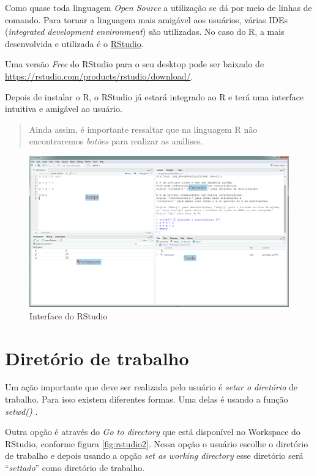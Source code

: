 \documentclass[
]{book}
\theoremstyle{definition}
\theoremstyle{definition}
\theoremstyle{definition}
\theoremstyle{remark}
\begin{document}
Como quase toda linguagem \emph{Open Source} a utilização se dá por meio de linhas de comando. Para tornar a linguagem mais amigável aos usuários, várias IDEs (\emph{integrated development environment}) são utilizadas. No caso do R, a mais desenvolvida e utilizada é o \href{https://rstudio.com/products/rstudio/}{RStudio}.

Uma versão \emph{Free} do RStudio para o seu desktop pode ser baixado de \url{https://rstudio.com/products/rstudio/download/}.

Depois de instalar o R, o RStudio já estará integrado ao R e terá uma interface intuitiva e amigável ao usuário.

\begin{quote}
Ainda assim, é importante ressaltar que na linguagem R não encontraremos \emph{botões} para realizar as análises.
\end{quote}

\begin{figure}
\includegraphics[width=0.9\linewidth]{Figuras/RStudio} \caption{Interface do RStudio}\label{fig:rstudio}
\end{figure}

\hypertarget{diretuxf3rio-de-trabalho}{%
\section{Diretório de trabalho}\label{diretuxf3rio-de-trabalho}}

Um ação importante que deve ser realizada pelo usuário é \emph{setar o diretório} de trabalho. Para isso existem diferentes formas. Uma delas é usando a função \emph{setwd()} .

Outra opção é através do \emph{Go to directory} que está disponível no Workspace do RStudio, conforme figura \ref{fig:rstudio2}. Nessa opção o usuário escolhe o diretório de trabalho e depois usando a opção \emph{set as working directory} esse diretório será ``\emph{settado}'' como diretório de trabalho.
\end{document}
